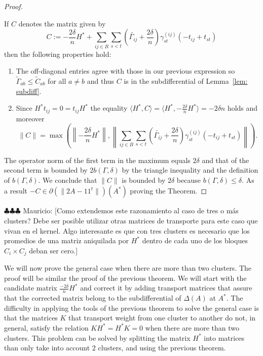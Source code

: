 \documentclass[12pt]{amsart}
\theoremstyle{remark}
\newcommand{\mv}[1]{{\color{red} \sf $\clubsuit\clubsuit\clubsuit$ Mauricio: [#1]}}
\begin{document}
\begin{proof}
\begin{enumerate}
\end{enumerate}
If $C$ denotes the matrix given by
\[C:= -\frac{2\delta}{n}H^* + \sum_{ij\in B} \sum_{s<t} \left(\widetilde{\Gamma_{ij}}+\frac{2\delta}{n}\right)\gamma_{st}^{(ij)} (-t_{ij}+t_{st})\]
then the following properties hold:
\begin{enumerate}
\item The off-diagonal entries agree with those in our previous expression so $\widetilde{\Gamma}_{ab}\leq \widetilde{C}_{ab}$ for all $a\neq b$ and thus $C$ is in the subdifferential of Lemma~\ref{lem: subdiff}.
\item Since $H^*t_{ij}=0=t_{ij}H^*$ the equality $\langle H^*, C\rangle =\langle H^*,-\frac{2\delta}{n}H^*\rangle = -2\delta n$ holds and moreover
\[ \| C\|=\max\left(\left\|-\frac{2\delta}{n}H^*\right\|, \left\|\sum_{ij\in B} \sum_{s<t} \left(\widetilde{\Gamma_{ij}}+\frac{2\delta}{n}\right)\gamma_{st}^{(ij)} (-t_{ij}+t_{st})\right\|\right).\] 
\end{enumerate}
The operator norm of the first term in the maximum equals $2\delta$ and that of the second term is bounded by $2b(\Gamma,\delta)$ by the triangle inequality and the definition of $b(\Gamma,\delta)$. We conclude that $\|C\|$ is bounded by $2\delta$ because $b(\Gamma,\delta)\leq \delta$. As a result $-C\in \partial\left(\|2A-11^t\|\right)(A^*)$ proving the Theorem.
\end{proof}

\mv{Como extendemos este razonamiento al caso de tres o m\'as clusters? Debe ser posible utilizar otras matrices de transporte para este caso que vivan en el kernel. Algo interesante es que con tres clusters es necesario que los promedios de una matriz aniquilada por $H^*$ dentro de cada uno de los bloques $C_i\times C_j$ deban ser cero.} 

We will now prove the general case when there are more than two clusters. The proof will be similar the proof of the previous theorem. We will start with the candidate matrix $\frac{-2\delta}{n}H^*$ and correct it by adding transport matrices that assure that the corrected matrix belong to the subdifferential of $\Delta(A)$ at $A^*$.
The difficulty in applying the tools of the previous theorem to solve the general case is that the matrices $K$ that transport weight from one cluster to another do not, in general, satisfy the relation $KH^* = H^*K = 0$ when there are more than two clusters. This problem can be solved by splitting the matrix $H^*$ into matrices than only take into account $2$ clusters, and using the previous theorem.
\end{document}
